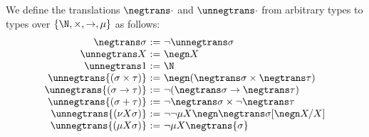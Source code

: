 We define the translations $\negtrans \cdot$ and $\unnegtrans \cdot$ from arbitrary types to types over $\{\N,\times, \to , \mu\}$ as follows:
\[
\begin{array}{r@{\ := \ }l}
\negtrans \sigma & \neg \unnegtrans \sigma\\ 
\unnegtrans X & \negn X \\
    \unnegtrans 1 & \N \\
    \unnegtrans{(\sigma \times \tau)} & \negn (\negtrans \sigma \times \negtrans \tau) \\
    \unnegtrans{(\sigma \to \tau)} & \neg( \negtrans\sigma \to \negtrans \tau) \\
    \unnegtrans{(\sigma+\tau)} & \neg   \negtrans \sigma \times \neg \negtrans \tau \\
    \unnegtrans{(\nu X \sigma)} & \neg \neg \mu X \negn \negtrans\sigma[\negn X / X] \\
    \unnegtrans{(\mu X \sigma)} &  \neg \mu X \negtrans{\sigma}
\end{array}
\]

